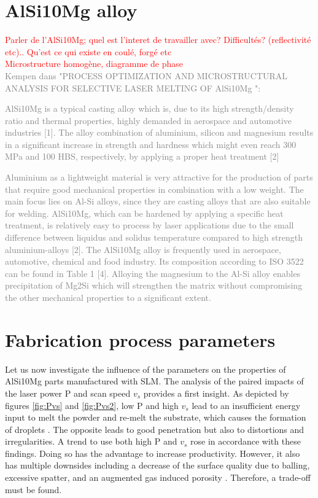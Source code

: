 \section{AlSi10Mg alloy}
\textcolor{red}{Parler de l'AlSi10Mg; quel est l'interet de travailler avec? Difficultés? (reflectivité etc).. Qu'est ce qui existe en coulé, forgé etc}\\
\textcolor{red}{Microstructure homogène, diagramme de phase}\\

\textcolor{gray}{Kempen dans "PROCESS OPTIMIZATION AND MICROSTRUCTURAL ANALYSIS FOR SELECTIVE LASER
MELTING OF AlSi10Mg ":}

\textcolor{gray}{AlSi10Mg is a typical casting alloy which is, due to its high strength/density ratio and thermal
properties, highly demanded in aerospace and automotive industries [1]. The alloy combination of aluminium,
silicon and magnesium results in a significant increase in strength and hardness which might even reach 300
MPa and 100 HBS, respectively, by applying a proper heat treatment [2]}

\textcolor{gray}{Aluminium as a lightweight material is very attractive for the production of parts that require good
mechanical properties in combination with a low weight. The main focus lies on Al-Si alloys, since they are
casting alloys that are also suitable for welding. AlSi10Mg, which can be hardened by applying a specific heat
treatment, is relatively easy to process by laser applications due to the small difference between liquidus and
solidus temperature compared to high strength aluminium-alloys [2]. The AlSi10Mg alloy is frequently used in
aerospace, automotive, chemical and food industry. Its composition according to ISO 3522 can be found in
Table 1 [4]. Alloying the magnesium to the Al-Si alloy enables precipitation of Mg2Si which will strengthen the
matrix without compromising the other mechanical properties to a significant extent.}

\section{Fabrication process parameters}
\label{pp}
Let us now investigate the influence of the parameters on the properties of AlSi10Mg parts manufactured with SLM. The analysis of the paired impacts of the laser power P and scan speed $v_s$ provides a first insight. As depicted by figures \ref{fig:Pvs} and \ref{fig:Pvs2}, low P and high $v_s$ lead to an insufficient energy input to melt the powder and re-melt the substrate, which causes the formation of droplets \parencite{Kempen110817} . The opposite leads to good penetration but also to distortions and irregularities.   A trend to use both high P and $v_s$ rose in accordance with these findings. Doing so has the advantage to increase productivity. However, it also has multiple downsides including a decrease of the surface quality due to balling, excessive spatter, and an augmented gas induced porosity \parencite{Mertens170406}. Therefore, a trade-off must be found. \\

